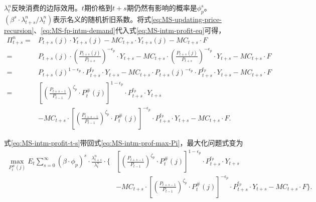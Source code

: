 $\lambda^n_t$反映消费的边际效用。$t$期价格到$t+s$期仍然有影响的概率是$\phi_p^s$。$(\beta^s \cdot \lambda^n_{t+s}/\lambda^n_t)$表示名义的随机折旧系数。将式\eqref{eq:MS-updating-price-recursion}、\eqref{eq:MS-fp-intm-demand}代入式\eqref{eq:MS-intm-profit-eq}可得，
\begin{equation}
\label{eq:MS-intm-profit-t-s}
\begin{split}
\Pi_{t+s}^n =& P_{t+s}(j) \cdot Y_{t+s}(j) - MC_{t+s} \cdot Y_{t+s}(j) - MC_{t+s} \cdot F \\
=& P_{t+s}(j) \cdot \left(\frac{P_{t+s}(j)}{P_{t+s}}\right)^{-\epsilon_p} \cdot Y_{t+s} - MC_{t+s} \cdot \left(\frac{P_{t+s}(j)}{P_{t+s}}\right)^{-\epsilon_p} \cdot Y_{t+s} - MC_{t+s} \cdot F \\
=& P_{t+s}(j)^{1-\epsilon_p} \cdot P_{t+s}^{\epsilon_p} \cdot Y_{t+s} - MC_{t+s} \cdot P_{t+s}(j)^{-\epsilon_p} \cdot P_{t+s}^{\epsilon_p} \cdot Y_{t+s} - MC_{t+s} \cdot F \\
=& \left[\left(\frac{P_{t+s-1}}{P_{t-1}}\right)^{\zeta_p} \cdot P_t^{\#}(j)\right]^{1-\epsilon_p} \cdot P_{t+s}^{\epsilon_p} \cdot Y_{t+s} \\
&- MC_{t+s} \cdot \left[\left(\frac{P_{t+s-1}}{P_{t-1}}\right)^{\zeta_p} \cdot P_t^{\#}(j)\right]^{-\epsilon_p} \cdot P_{t+s}^{\epsilon_p} \cdot Y_{t+s} - MC_{t+s} \cdot F.
\end{split}
\end{equation}

式\eqref{eq:MS-intm-profit-t-s}带回式\eqref{eq:MS-intm-prof-max-Pi}，最大化问题式变为
\begin{equation}
\label{eq:MS-intm-prof-max-Psharp}
\begin{split}
\max_{P_t^{\#}(j)} E_t \sum_{s=0}^{\infty} \left(\beta \cdot \phi_p \right)^s \cdot \frac{\lambda^n_{t+s}}{\lambda^n_{t}} \cdot \{&
\left[\left(\frac{P_{t+s-1}}{P_{t-1}}\right)^{\zeta_p} \cdot P_t^{\#}(j)\right]^{1-\epsilon_p} \cdot P_{t+s}^{\epsilon_p} \cdot Y_{t+s} \\
&- MC_{t+s} \cdot \left[\left(\frac{P_{t+s-1}}{P_{t-1}}\right)^{\zeta_p} \cdot P_t^{\#}(j)\right]^{-\epsilon_p} \cdot P_{t+s}^{\epsilon_p} \cdot Y_{t+s} - MC_{t+s} \cdot F\}.
\end{split}
\end{equation}

